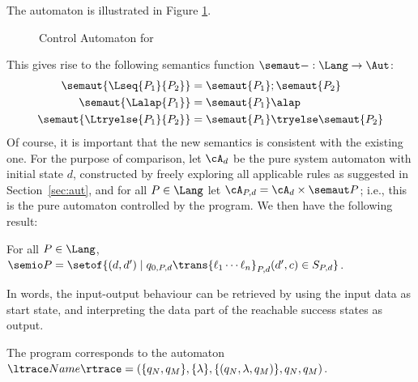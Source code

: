 \iffull
The automaton is illustrated in Figure \ref{fig:aut_rule}.
\begin{figure}
\centering
{}
\caption{Control Automaton for }
\label{fig:aut_rule}
\end{figure}
\fi
%
%
This gives rise to the following semantics function $\semaut-: \Lang \rightarrow
\Aut$:
%
\begin{align*}
\semaut{\Lseq{P_1}{P_2}} &= \semaut{P_1};\semaut{P_2}\\
\semaut{\Lalap{P_1}} &= \semaut{P_1}\alap\\
\semaut{\Ltryelse{P_1}{P_2}} &= \semaut{P_1} \tryelse \semaut{P_2}
\end{align*}
%
Of course, it is important that the new semantics is consistent with the
existing one. For the purpose of comparison, let $\cA_d$ be the pure system
automaton with initial state $d$, constructed by freely exploring all
applicable rules as suggested in Section~\ref{sec:aut}, and for all $P\in
\Lang$ let $\cA_{P,d}=\cA_d\times \semaut P$; i.e., this is the pure automaton
controlled by the program. We then have the following result:
%
\begin{theorem}\label{th:io=aut}
For all $P\in \Lang$, $\semio P = \setof{(d,d') \mid q_{0,P,d}
  \trans{\ell_1\cdots \ell_n}_{P,d} (d',c) \in S_{P,d}}$.
\end{theorem}
%
In words, the input-output behaviour can be retrieved by using the input data
as start state, and interpreting the data part of the reachable success states
as output.
\iffull
%
%
\begin{definition}
The program \Ltrue corresponds to the automaton
$\ltrace Name \rtrace = (\{q_{N},q_{M}\},\{\lambda\},\{(q_{N},\lambda,q_{M})\},q_{N},q_{M})$.
\end{definition}

